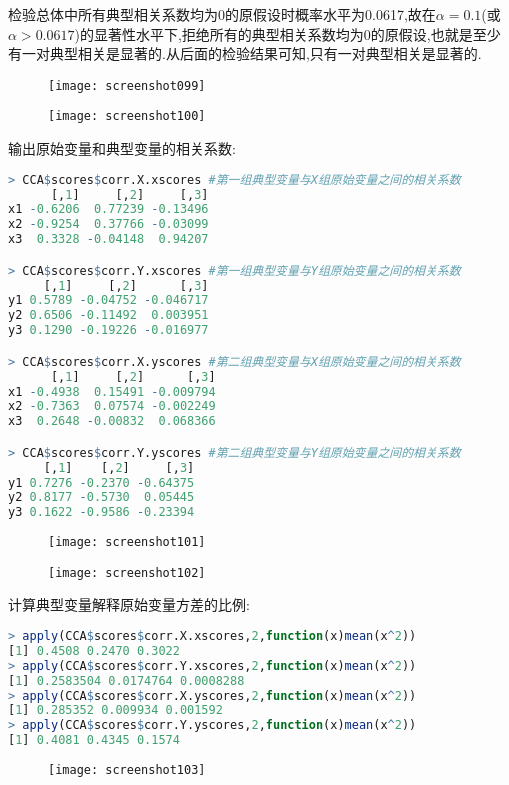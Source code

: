 \documentclass[11pt,a4paper,oneside]{book}
\begin{document}
检验总体中所有典型相关系数均为0的原假设时概率水平为0.0617,故在$ \alpha=0.1 $(或$ \alpha>0.0617 $)的显著性水平下,拒绝所有的典型相关系数均为0的原假设,也就是至少有一对典型相关是显著的.从后面的检验结果可知,只有一对典型相关是显著的.
\begin{figure}[H]
	\centering
	\texttt{[image: screenshot099]}
\end{figure}
\begin{figure}[H]
	\centering
	\texttt{[image: screenshot100]}
\end{figure}

输出原始变量和典型变量的相关系数:
\begin{lstlisting}[language=r]
> CCA$scores$corr.X.xscores #第一组典型变量与X组原始变量之间的相关系数
      [,1]     [,2]     [,3]
x1 -0.6206  0.77239 -0.13496
x2 -0.9254  0.37766 -0.03099
x3  0.3328 -0.04148  0.94207

> CCA$scores$corr.Y.xscores #第一组典型变量与Y组原始变量之间的相关系数
     [,1]     [,2]      [,3]
y1 0.5789 -0.04752 -0.046717
y2 0.6506 -0.11492  0.003951
y3 0.1290 -0.19226 -0.016977

> CCA$scores$corr.X.yscores #第二组典型变量与X组原始变量之间的相关系数
      [,1]     [,2]      [,3]
x1 -0.4938  0.15491 -0.009794
x2 -0.7363  0.07574 -0.002249
x3  0.2648 -0.00832  0.068366

> CCA$scores$corr.Y.yscores #第二组典型变量与Y组原始变量之间的相关系数
     [,1]    [,2]     [,3]
y1 0.7276 -0.2370 -0.64375
y2 0.8177 -0.5730  0.05445
y3 0.1622 -0.9586 -0.23394
\end{lstlisting}
\begin{figure}[H]
	\centering
	\texttt{[image: screenshot101]}
\end{figure}
\begin{figure}[H]
	\centering
	\texttt{[image: screenshot102]}
\end{figure}

计算典型变量解释原始变量方差的比例:
\begin{lstlisting}[language=r]
> apply(CCA$scores$corr.X.xscores,2,function(x)mean(x^2))
[1] 0.4508 0.2470 0.3022
> apply(CCA$scores$corr.Y.xscores,2,function(x)mean(x^2))
[1] 0.2583504 0.0174764 0.0008288
> apply(CCA$scores$corr.X.yscores,2,function(x)mean(x^2))
[1] 0.285352 0.009934 0.001592
> apply(CCA$scores$corr.Y.yscores,2,function(x)mean(x^2))
[1] 0.4081 0.4345 0.1574
\end{lstlisting}
\begin{figure}[H]
	\centering
	\texttt{[image: screenshot103]}
\end{figure}
\end{document}
